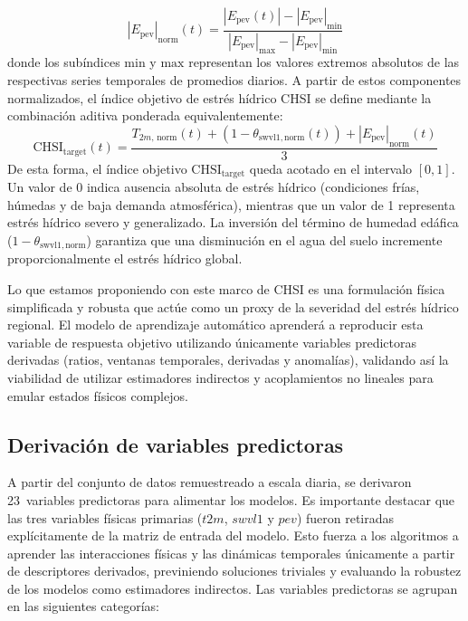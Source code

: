 \documentclass[12pt, a4paper]{article}
\begin{document}
\begin{equation}
    |E_{\text{pev}}|_{\text{norm}}(t) = \frac{|E_{\text{pev}}(t)| - |E_{\text{pev}}|_{\text{min}}}{|E_{\text{pev}}|_{\text{max}} - |E_{\text{pev}}|_{\text{min}}}
\end{equation}
%
donde los subíndices $\text{min}$ y $\text{max}$ representan los valores extremos absolutos de las respectivas series temporales de promedios diarios. A partir de estos componentes normalizados, el índice objetivo de estrés hídrico CHSI se define mediante la combinación aditiva ponderada equivalentemente:
%
\begin{equation}
    \text{CHSI}_{\text{target}}(t) = \frac{T_{2m,\,\text{norm}}(t) + (1 - \theta_{\text{swvl1},\,\text{norm}}(t)) + |E_{\text{pev}}|_{\text{norm}}(t)}{3}
    \label{eq:chsi}
\end{equation}
%
De esta forma, el índice objetivo $\text{CHSI}_{\text{target}}$ queda acotado en el intervalo $[0, 1]$. Un valor de 0 indica ausencia absoluta de estrés hídrico (condiciones frías, húmedas y de baja demanda atmosférica), mientras que un valor de 1 representa estrés hídrico severo y generalizado. La inversión del término de humedad edáfica ($1 - \theta_{\text{swvl1},\,\text{norm}}$) garantiza que una disminución en el agua del suelo incremente proporcionalmente el estrés hídrico global.

Lo que estamos proponiendo con este marco de CHSI es una formulación física simplificada y robusta que actúe como un proxy de la severidad del estrés hídrico regional. El modelo de aprendizaje automático aprenderá a reproducir esta variable de respuesta objetivo utilizando únicamente variables predictoras derivadas (ratios, ventanas temporales, derivadas y anomalías), validando así la viabilidad de utilizar estimadores indirectos y acoplamientos no lineales para emular estados físicos complejos.

\subsection{Derivación de variables predictoras}
\label{subsec:features}

A partir del conjunto de datos remuestreado a escala diaria, se derivaron 23~variables predictoras para alimentar los modelos. Es importante destacar que las tres variables físicas primarias ($t2m$, $swvl1$ y $pev$) fueron retiradas explícitamente de la matriz de entrada del modelo. Esto fuerza a los algoritmos a aprender las interacciones físicas y las dinámicas temporales únicamente a partir de descriptores derivados, previniendo soluciones triviales y evaluando la robustez de los modelos como estimadores indirectos. Las variables predictoras se agrupan en las siguientes categorías:
\end{document}
